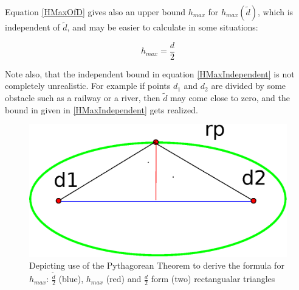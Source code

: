 Equation \ref{HMaxOfD} gives also an upper bound $h_{max}$ for $h_{max}(\tilde{d})$,
which is independent of $\tilde{d}$, and may be easier to calculate in some situations:

\begin{equation}
 \label{HMaxIndependent}  
 h_{max}=\frac{d}{2}
\end{equation}

Note also, that the independent bound in equation \ref{HMaxIndependent} is not completely unrealistic.
For example if points $d_1$ and $d_2$ are divided by some obstacle such as a railway or a river, then 
$\tilde{d}$ may come close to zero, and the bound in given in \ref{HMaxIndependent} gets realized.

\begin{figure}[h]
\includegraphics[scale=0.5]{images/03.05.formula.eps}
\caption{Depicting use of the Pythagorean Theorem to derive the formula for $h_{max}$: 
 	 $\frac{\tilde{d}}{2}$ (blue), $h_{max}$ (red) and $\frac{d}{2}$ form 
	 (two) rectangualar triangles
	}
\end{figure}









